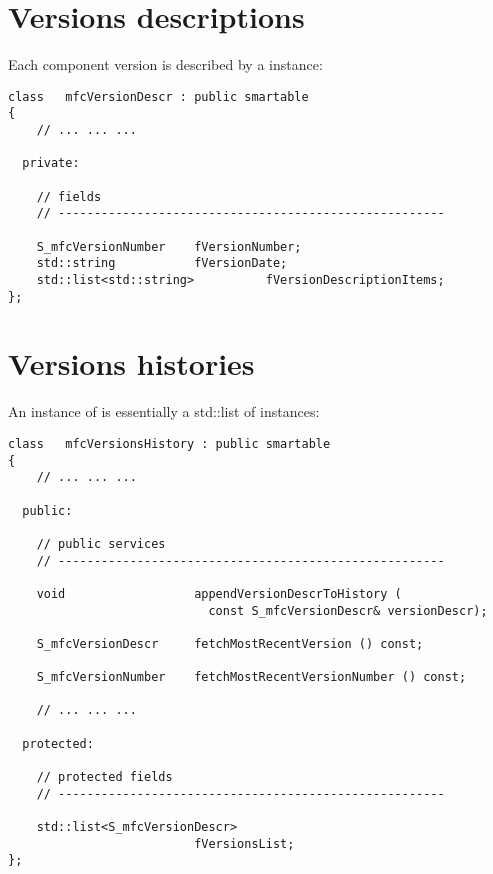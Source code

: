 \section{Versions descriptions}\label{Versions descriptions}

Each component version is described by a  instance:
\begin{lstlisting}[language=CPlusPlus]
class   mfcVersionDescr : public smartable
{
	// ... ... ...

  private:

    // fields
    // ------------------------------------------------------

    S_mfcVersionNumber    fVersionNumber;
    std::string           fVersionDate;
    std::list<std::string>          fVersionDescriptionItems;
};
\end{lstlisting}


\section{Versions histories}\label{Versions histories}

An instance of  is essentially a std::list of  instances:
\begin{lstlisting}[language=CPlusPlus]
class   mfcVersionsHistory : public smartable
{
	// ... ... ...

  public:

    // public services
    // ------------------------------------------------------

    void                  appendVersionDescrToHistory (
                            const S_mfcVersionDescr& versionDescr);

    S_mfcVersionDescr     fetchMostRecentVersion () const;

    S_mfcVersionNumber    fetchMostRecentVersionNumber () const;

	// ... ... ...

  protected:

    // protected fields
    // ------------------------------------------------------

    std::list<S_mfcVersionDescr>
                          fVersionsList;
};
\end{lstlisting}

